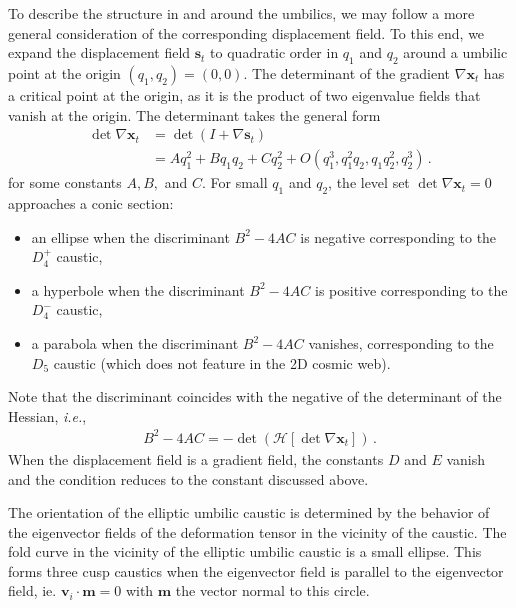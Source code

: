 \documentclass[a4paper, 11pt]{article}
\begin{document}
\bigskip
To describe the structure in and around the umbilics, we may follow a more general consideration of the corresponding displacement field. To this end, we expand the displacement field $\bm{s}_t$ to quadratic order in $q_1$ and $q_2$ around a umbilic point at the origin $(q_1,q_2)=(0,0)$. The determinant of the gradient $\nabla \bm{x}_t$ has a critical point at the origin, as it is the product of two eigenvalue fields that vanish at the origin. The determinant takes the general form
\begin{align}
\det \nabla \bm{x}_t&=\det(I + \nabla \bm{s}_t)\nonumber\\
&= 
A q_1^2 + B q_1 q_2 + C q_2^2 + O(q_1^3,q_1^2 q_2,q_1 q_2^2,q_2^3)\,.
\end{align}
for some constants $A,B,$ and $C$.
For small $q_1$ and $q_2$, the level set $\det \nabla \bm{x}_t =0$ approaches a conic section:
\begin{itemize}
\item an ellipse when the discriminant $B^2 - 4AC$ is negative corresponding to the $D_4^+$ caustic,
\item a hyperbole when the discriminant $B^2 - 4AC$ is positive corresponding to the $D_4^-$ caustic,
\item a parabola when the discriminant $B^2 - 4AC$ vanishes, corresponding to the $D_5$ caustic (which does not feature in the 2D cosmic web).
\end{itemize}
Note that the discriminant coincides with the negative of the determinant of the Hessian, \textit{i.e.},
\begin{align}
B^2-4AC = -\det \left(\mathcal{H} \left[\det \nabla \bm{x}_t \right]\right)\,.
\end{align}
When the displacement field is a gradient field, the constants $D$ and $E$ vanish and the condition reduces to the constant discussed above.

The orientation of the elliptic umbilic caustic is determined by the behavior of the eigenvector fields of the deformation tensor in the vicinity of the caustic. The fold curve in the vicinity of the elliptic umbilic caustic is a small ellipse. This forms three cusp caustics when the eigenvector field is parallel to the eigenvector field, ie. $\bm{v}_i \cdot \bm{m} = 0$ with $\bm{m}$ the vector normal to this circle.
\end{document}
